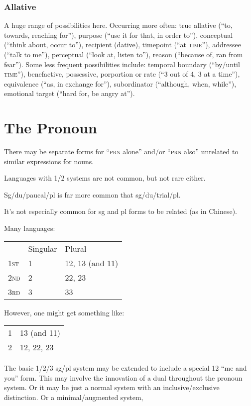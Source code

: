 \documentclass[11pt]{article}
\newcommand{\I}[1]{\textsc{#1}}   %
\begin{document}
\subsubsection{Allative} A huge range of possibilities here.
Occurring more often: true allative (``to, towards, reaching for''),
purpose (``use it for that, in order to''), conceptual (``think about,
occur to''), recipient (dative), timepoint (``at \I{time}''),
addressee (``talk to me''), perceptual (``look at, listen to''),
reason (``because of, ran from fear'').  Some less frequent
possibilities include: temporal boundary (``by/until \I{time}''),
benefactive, possessive, porportion or rate (``3 out of 4, 3 at a
time''), equivalence (``as, in exchange for''), subordinator
(``although, when, while''), emotional target (``hard for, be angry
at'').


\section{The Pronoun}
There may be separate forms for ``\I{prn} alone'' and/or ``\I{prn}
also'' unrelated to similar expressions for nouns.

Languages with 1/2 systems are not common, but not rare either.

Sg/du/paucal/pl is far more common that sg/du/trial/pl.

It's not especially common for sg and pl forms to be related (as in
Chinese).

Many languages:

\begin{center}
\begin{tabular}{lll}
  & Singular & Plural \\
\I{1st} & 1 & 12, 13 (and 11) \\
\I{2nd} & 2 & 22, 23 \\
\I{3rd} & 3 & 33
\end{tabular}
\end{center}

However, one might get something like:

\begin{center}
\begin{tabular}{ll}
1 & 13 (and 11) \\
2 & 12, 22, 23     
\end{tabular}
\end{center}

The basic 1/2/3 sg/pl system may be extended to include a special 12
``me and you'' form.  This may involve the innovation of a dual
throughout the pronoun system.  Or it may be just a normal system with
an inclusive/exclusive distinction.  Or a minimal/augmented system, 
\end{document}
